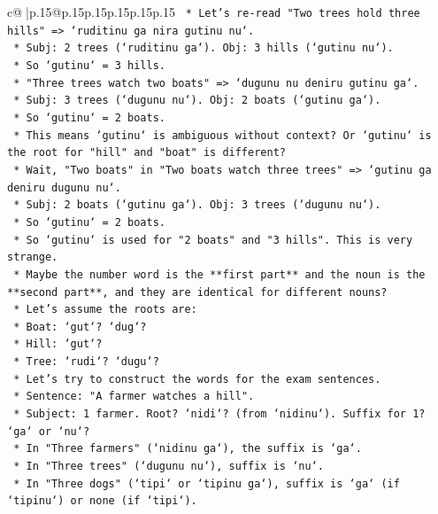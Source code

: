 \documentclass{article}
\begin{document}
{\begin{supertabular}{c@{$\;$}|p{.15\linewidth}@{}p{.15\linewidth}p{.15\linewidth}p{.15\linewidth}p{.15\linewidth}p{.15\linewidth}}
{{{\texttt{        *   Let's re{-}read "Two trees hold three hills" => `ruditinu ga nira gutinu nu`.} \\
\texttt{            *   Subj: 2 trees (`ruditinu ga`). Obj: 3 hills (`gutinu nu`).} \\
\texttt{            *   So `gutinu` = 3 hills.} \\
\texttt{        *   "Three trees watch two boats" => `dugunu nu deniru gutinu ga`.} \\
\texttt{            *   Subj: 3 trees (`dugunu nu`). Obj: 2 boats (`gutinu ga`).} \\
\texttt{            *   So `gutinu` = 2 boats.} \\
\texttt{        *   This means `gutinu` is ambiguous without context? Or `gutinu` is the root for "hill" and "boat" is different?} \\
\texttt{        *   Wait, "Two boats" in "Two boats watch three trees" => `gutinu ga deniru dugunu nu`.} \\
\texttt{            *   Subj: 2 boats (`gutinu ga`). Obj: 3 trees (`dugunu nu`).} \\
\texttt{            *   So `gutinu` = 2 boats.} \\
\texttt{        *   So `gutinu` is used for "2 boats" and "3 hills". This is very strange.} \\
\texttt{        *   Maybe the number word is the **first part** and the noun is the **second part**, and they are identical for different nouns?} \\
\texttt{        *   Let's assume the roots are:} \\
\texttt{            *   Boat: `gut`? `dug`?} \\
\texttt{            *   Hill: `gut`?} \\
\texttt{            *   Tree: `rudi`? `dugu`?} \\
\texttt{        *   Let's try to construct the words for the exam sentences.} \\
\texttt{        *   Sentence: "A farmer watches a hill".} \\
\texttt{            *   Subject: 1 farmer. Root? `nidi`? (from `nidinu`). Suffix for 1? `ga` or `nu`?} \\
\texttt{            *   In "Three farmers" (`nidinu ga`), the suffix is `ga`.} \\
\texttt{            *   In "Three trees" (`dugunu nu`), suffix is `nu`.} \\
\texttt{            *   In "Three dogs" (`tipi` or `tipinu ga`), suffix is `ga` (if `tipinu`) or none (if `tipi`).} \\
}}}
\end{supertabular}}
\end{document}
